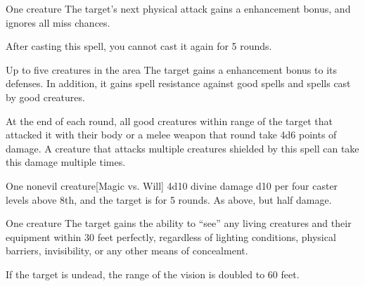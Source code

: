 \spellrng{\rngmed}
\begin{spelltarget}{One creature}
    \spelleffect The target's next physical attack gains a  enhancement bonus, and ignores all miss chances. 
\end{spelltarget}
\spellnotes After casting this spell, you cannot cast it again for 5 rounds.

\begin{comment}
\subsubsection{U-Z}
\end{comment}

\spelldur{\durshort \dismissable}
\begin{spelltargets}{Up to five creatures in the area}
    The target gains a  enhancement bonus to its defenses. In addition, it gains spell resistance against good spells and spells cast by good creatures.
    \par At the end of each round, all good creatures within \rngclose range of the target that attacked it with their body or a melee weapon that round take 4d6 points of damage. A creature that attacks multiple creatures shielded by this spell can take this damage multiple times.
\end{spelltargets}
\spellline

\spellrng{\rngmed}
\begin{spelltarget}{One nonevil creature}[Magic vs. Will]
    \spellsuccess 4d10 divine damage \add d10 per four caster levels above 8th, and the target is \sickened for 5 rounds.
    \spellfailure As above, but half damage.
\end{spelltarget}

\spelldur{\durlong \dismissable}
\begin{spelltarget}{One creature}
    \spelleffect The target gains the ability to ``see'' any living creatures and their equipment within 30 feet perfectly, regardless of lighting conditions, physical barriers, invisibility, or any other means of concealment.

    If the target is undead, the range of the vision is doubled to 60 feet.
\end{spelltarget}

